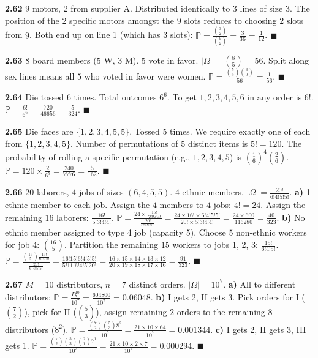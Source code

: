 \documentclass[11pt]{article}
\theoremstyle{definition}
\begin{document}
\textbf{2.62} 
$9$ motors, $2$ from supplier A. Distributed identically to $3$ lines of size $3$. The position of the $2$ specific motors amongst the $9$ slots reduces to choosing $2$ slots from $9$. Both end up on line 1 (which has 3 slots):
$\mathbb{P} = \frac{\binom{3}{2}}{\binom{9}{2}} = \frac{3}{36} = \frac{1}{12}$. $\blacksquare$

\textbf{2.63} 
$8$ board members ($5$ W, $3$ M). $5$ vote in favor. $|\Omega| = \binom{8}{5} = 56$.
Split along sex lines means all $5$ who voted in favor were women. $\mathbb{P} = \frac{\binom{5}{5} \binom{3}{0}}{56} = \frac{1}{56}$. $\blacksquare$

\textbf{2.64} 
Die tossed $6$ times. Total outcomes $6^6$. To get $1,2,3,4,5,6$ in any order is $6!$.
$\mathbb{P} = \frac{6!}{6^6} = \frac{720}{46656} = \frac{5}{324}$. $\blacksquare$

\textbf{2.65} 
Die faces are $\{1,2,3,4,5,5\}$. Tossed $5$ times. We require exactly one of each from $\{1,2,3,4,5\}$.
Number of permutations of $5$ distinct items is $5! = 120$. The probability of rolling a specific permutation (e.g., $1,2,3,4,5$) is $(\frac{1}{6})^4 (\frac{2}{6})$.
$\mathbb{P} = 120 \times \frac{2}{6^5} = \frac{240}{7776} = \frac{5}{162}$. $\blacksquare$

\textbf{2.66} 
$20$ laborers, $4$ jobs of sizes $(6,4,5,5)$. $4$ ethnic members. $|\Omega| = \frac{20!}{6!4!5!5!}$.
\textbf{a)} 1 ethnic member to each job. Assign the $4$ members to $4$ jobs: $4! = 24$. Assign the remaining $16$ laborers: $\frac{16!}{5!3!4!4!}$.
$\mathbb{P} = \frac{24 \times \frac{16!}{5!3!4!4!}}{\frac{20!}{6!4!5!5!}} = \frac{24 \times 16! \times 6!4!5!5!}{20! \times 5!3!4!4!} = \frac{24 \times 600}{116280} = \frac{40}{323}$.
\textbf{b)} No ethnic member assigned to type 4 job (capacity 5).
Choose $5$ non-ethnic workers for job 4: $\binom{16}{5}$. Partition the remaining $15$ workers to jobs 1, 2, 3: $\frac{15!}{6!4!5!}$.
$\mathbb{P} = \frac{\binom{16}{5} \frac{15!}{6!4!5!}}{\frac{20!}{6!4!5!5!}} = \frac{16! 15! 6! 4! 5! 5!}{5! 11! 6! 4! 5! 20!} = \frac{16 \times 15 \times 14 \times 13 \times 12}{20 \times 19 \times 18 \times 17 \times 16} = \frac{91}{323}$. $\blacksquare$

\textbf{2.67} 
$M=10$ distributors, $n=7$ distinct orders. $|\Omega| = 10^7$.
\textbf{a)} All to different distributors: $\mathbb{P} = \frac{P^{10}_7}{10^7} = \frac{604800}{10^7} = 0.06048$.
\textbf{b)} I gets 2, II gets 3. Pick orders for I ($\binom{7}{2}$), pick for II ($\binom{5}{3}$), assign remaining $2$ orders to the remaining $8$ distributors ($8^2$).
$\mathbb{P} = \frac{\binom{7}{2} \binom{5}{3} 8^2}{10^7} = \frac{21 \times 10 \times 64}{10^7} = 0.001344$.
\textbf{c)} I gets 2, II gets 3, III gets 1.
$\mathbb{P} = \frac{\binom{7}{2} \binom{5}{3} \binom{2}{1} 7^1}{10^7} = \frac{21 \times 10 \times 2 \times 7}{10^7} = 0.000294$. $\blacksquare$
\end{document}
